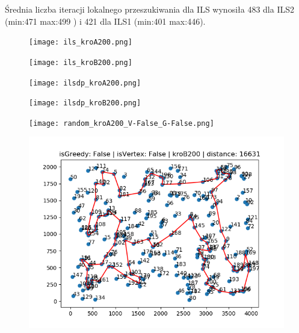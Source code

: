 \documentclass{article}
\begin{document}
Średnia liczba iteracji lokalnego przeszukiwania dla ILS wynosiła 483 dla ILS2 (min:471 max:499 ) i 421 dla ILS1 (min:401 max:446).  \\

\begin{figure}[h!]
  \centering
  \begin{minipage}[b]{0.8\textwidth}
    \texttt{[image: ils\_kroA200.png]}
  \end{minipage}

  \begin{minipage}[b]{0.8\textwidth}
    \texttt{[image: ils\_kroB200.png]}
  \end{minipage}
  
\end{figure}
    
\begin{figure}[h!]
    \centering
  \begin{minipage}[b]{0.8\textwidth}
    \texttt{[image: ilsdp\_kroA200.png]}
  \end{minipage}

  \begin{minipage}[b]{0.8\textwidth}
    \texttt{[image: ilsdp\_kroB200.png]}
  \end{minipage}
\end{figure}

\begin{figure}[h!]
    \centering
  \begin{minipage}[b]{0.8\textwidth}
    \texttt{[image: random\_kroA200\_V-False\_G-False.png]}
  \end{minipage}

  \begin{minipage}[b]{0.8\textwidth}
    \includegraphics[width=\textwidth]{random_kroB200_V-False_G-False.png}
  \end{minipage}
\end{figure}
\end{document}
